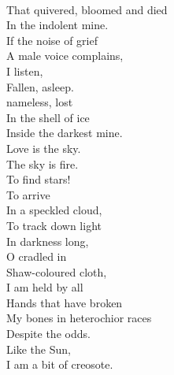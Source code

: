 \documentclass[smalldemyvopaper,11pt,twoside,onecolumn,openright,extrafontsizes]{memoir}
\begin{document}
\\That quivered, bloomed and died
\\In the indolent mine.
\\If the noise of grief
\\A male voice complains,
\\I listen,
\\Fallen, asleep.
\\nameless, lost
\\In the shell of ice
\\Inside the darkest mine.
\\Love is the sky.
\\The sky is fire.
\\To find stars!
\\To arrive
\\In a speckled cloud,
\\To track down light
\\In darkness long,
\\O cradled in
\\Shaw-coloured cloth,
\\I am held by all
\\Hands that have broken
\\My bones in heterochior races
\\Despite the odds.
\\Like the Sun,
\\I am a bit of creosote.
\end{document}
